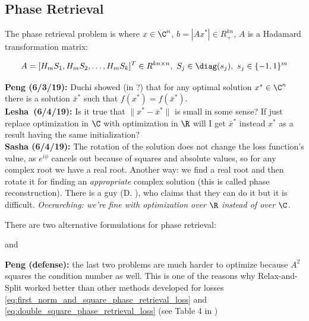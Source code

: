 \documentclass[11pt,letterpaper]{article}
\newcommand{\userId}{Lesha}
\newcommand{\Peng}[1]{\textbf{Peng (#1):}}
\newcommand{\Sasha}[1]{\textbf{Sasha (#1):}}
\newcommand{\Lesha}[1]{\textbf{\userId\ (#1):}}
\numberwithin{equation}{section} %
\numberwithin{figure}{section} %
\numberwithin{table}{section} %
\begin{document}
    
\subsection*{Phase Retrieval} 

The phase retrieval problem is 
where $x \in \C^n$, $b = |Ax^*| \in R^{kn}_+$, $A$ is a Hadamard transformation matrix:

\[
    A = [H_mS_1, H_mS_2, \dots, H_mS_k]^T \in R^{kn\times n} ,\ S_j \in \diag(s_j), \ s_j \in \{-1, 1\}^m
\]

\begin{tip}
\Peng{6/3/19} Duchi showed (in \cite{Duchi2017PhaseRetrival}?) that for any optimal solution $x^* \in \C^n$ there is a solution $\bar{x}^*$ such that $f(x^*) = f(\bar{x}^*)$.  \\
\Lesha{6/4/19} Is it true that $\|x^* - \bar{x}^*\|$ is small in some sense? If just replace optimization in $\C$ with optimization in $\R$ will I get $\bar{x}^*$ instead $x^*$ as a result having the same initialization? \\
\Sasha{6/4/19} The rotation of the solution does not change the loss function's value, as $e^{i\phi}$ cancels out because of squares and absolute values, so for any complex root we have a real root. Another way: we find a real root and then rotate it for finding an \textit{appropriate} complex solution (this is called phase reconstruction). There is a guy (D. ), who claims that they can do it but it is difficult. \textit{Overarching: we're fine with optimization over $\R$ instead of over $\C$.}
\end{tip}

There are two alternative formulations for phase retrieval:


and 


\begin{tip}
\Peng{defense} the last two problems are much harder to optimize because $A^2$ squares the condition number as well. This is one of the reasons why Relax-and-Split worked better than other methods developed for losses \ref{eq:first_norm_and_square_phase_retrieval_loss} and \ref{eq:double_square_phase_retrieval_loss} (see Table 4 in \cite{Zheng2018RelaxAndSplit})    
\end{tip}
\end{document}
